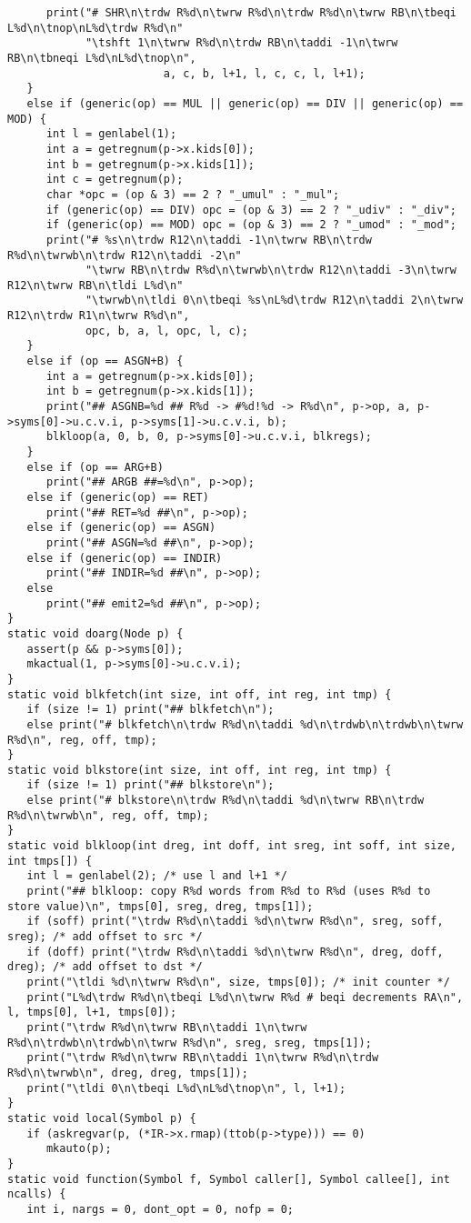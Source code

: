{\begin{verbatim}
      print("# SHR\n\trdw R%d\n\twrw R%d\n\trdw R%d\n\twrw RB\n\tbeqi L%d\n\tnop\nL%d\trdw R%d\n"
            "\tshft 1\n\twrw R%d\n\trdw RB\n\taddi -1\n\twrw RB\n\tbneqi L%d\nL%d\tnop\n",
						a, c, b, l+1, l, c, c, l, l+1);
   }
   else if (generic(op) == MUL || generic(op) == DIV || generic(op) == MOD) {
      int l = genlabel(1);
      int a = getregnum(p->x.kids[0]);
      int b = getregnum(p->x.kids[1]);
      int c = getregnum(p);
      char *opc = (op & 3) == 2 ? "_umul" : "_mul";
      if (generic(op) == DIV) opc = (op & 3) == 2 ? "_udiv" : "_div";
      if (generic(op) == MOD) opc = (op & 3) == 2 ? "_umod" : "_mod";
      print("# %s\n\trdw R12\n\taddi -1\n\twrw RB\n\trdw R%d\n\twrwb\n\trdw R12\n\taddi -2\n"
            "\twrw RB\n\trdw R%d\n\twrwb\n\trdw R12\n\taddi -3\n\twrw R12\n\twrw RB\n\tldi L%d\n"
            "\twrwb\n\tldi 0\n\tbeqi %s\nL%d\trdw R12\n\taddi 2\n\twrw R12\n\trdw R1\n\twrw R%d\n",
            opc, b, a, l, opc, l, c);
   }
   else if (op == ASGN+B) {
      int a = getregnum(p->x.kids[0]);
      int b = getregnum(p->x.kids[1]);
      print("## ASGNB=%d ## R%d -> #%d!%d -> R%d\n", p->op, a, p->syms[0]->u.c.v.i, p->syms[1]->u.c.v.i, b);
      blkloop(a, 0, b, 0, p->syms[0]->u.c.v.i, blkregs);
   }
   else if (op == ARG+B)
      print("## ARGB ##=%d\n", p->op);
   else if (generic(op) == RET)
      print("## RET=%d ##\n", p->op);
   else if (generic(op) == ASGN)
      print("## ASGN=%d ##\n", p->op);
   else if (generic(op) == INDIR)
      print("## INDIR=%d ##\n", p->op);
   else
      print("## emit2=%d ##\n", p->op);
}
static void doarg(Node p) {
   assert(p && p->syms[0]);
   mkactual(1, p->syms[0]->u.c.v.i);
}
static void blkfetch(int size, int off, int reg, int tmp) {
   if (size != 1) print("## blkfetch\n");
   else print("# blkfetch\n\trdw R%d\n\taddi %d\n\trdwb\n\trdwb\n\twrw R%d\n", reg, off, tmp);
}
static void blkstore(int size, int off, int reg, int tmp) {
   if (size != 1) print("## blkstore\n");
   else print("# blkstore\n\trdw R%d\n\taddi %d\n\twrw RB\n\trdw R%d\n\twrwb\n", reg, off, tmp);
}
static void blkloop(int dreg, int doff, int sreg, int soff, int size, int tmps[]) {
   int l = genlabel(2); /* use l and l+1 */
   print("## blkloop: copy R%d words from R%d to R%d (uses R%d to store value)\n", tmps[0], sreg, dreg, tmps[1]);
   if (soff) print("\trdw R%d\n\taddi %d\n\twrw R%d\n", sreg, soff, sreg); /* add offset to src */
   if (doff) print("\trdw R%d\n\taddi %d\n\twrw R%d\n", dreg, doff, dreg); /* add offset to dst */
   print("\tldi %d\n\twrw R%d\n", size, tmps[0]); /* init counter */
   print("L%d\trdw R%d\n\tbeqi L%d\n\twrw R%d # beqi decrements RA\n", l, tmps[0], l+1, tmps[0]);
   print("\trdw R%d\n\twrw RB\n\taddi 1\n\twrw R%d\n\trdwb\n\trdwb\n\twrw R%d\n", sreg, sreg, tmps[1]);
   print("\trdw R%d\n\twrw RB\n\taddi 1\n\twrw R%d\n\trdw R%d\n\twrwb\n", dreg, dreg, tmps[1]);
   print("\tldi 0\n\tbeqi L%d\nL%d\tnop\n", l, l+1);
}
static void local(Symbol p) {
   if (askregvar(p, (*IR->x.rmap)(ttob(p->type))) == 0)
      mkauto(p);
}
static void function(Symbol f, Symbol caller[], Symbol callee[], int ncalls) {
   int i, nargs = 0, dont_opt = 0, nofp = 0;


\end{verbatim}}
